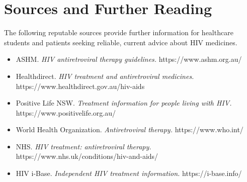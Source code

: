 \section*{Sources and Further Reading}
The following reputable sources provide further information for healthcare students and patients seeking reliable, current advice about HIV medicines.

\begin{itemize}
    \item ASHM. \textit{HIV antiretroviral therapy guidelines.} https://www.ashm.org.au/
    \item Healthdirect. \textit{HIV treatment and antiretroviral medicines.} https://www.healthdirect.gov.au/hiv-aids
    \item Positive Life NSW. \textit{Treatment information for people living with HIV.} https://www.positivelife.org.au/
    \item World Health Organization. \textit{Antiretroviral therapy.} https://www.who.int/
    \item NHS. \textit{HIV treatment: antiretroviral therapy.} https://www.nhs.uk/conditions/hiv-and-aids/
    \item HIV i-Base. \textit{Independent HIV treatment information.} https://i-base.info/
\end{itemize}
